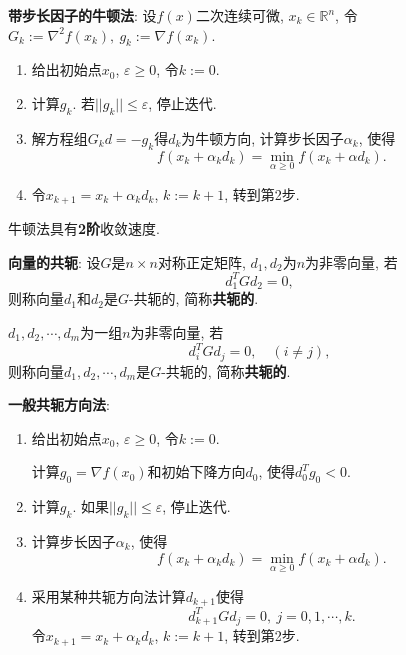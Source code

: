 \documentclass[12pt, a4paper, oneside]{ctexart}
\let\leq=\leqslant %
\let\geq=\geqslant %
\def\R{\mathbb{R}}          %
\begin{document}
\textbf{带步长因子的牛顿法}: 设$f(x)$二次连续可微, $x_k \in \R^n$, 令$G_k:= \nabla^2 f(x_k),\ g_k:= \nabla f(x_k)$.
\begin{enumerate}
    \item 给出初始点$x_0$, $\varepsilon \geq 0$, 令$k:=0$.
    \item 计算$g_k$. 若$||g_k|| \leq \varepsilon$, 停止迭代.
    \item 解方程组$G_kd = -g_k$得$d_k$为牛顿方向, 计算步长因子$\alpha_k$, 使得
    \begin{equation*}
        f(x_k+\alpha_kd_k) = \min_{\alpha \geq 0} f(x_k+\alpha d_k).
    \end{equation*}
    \item 令$x_{k+1} = x_k + \alpha_k d_k$, $k:= k+1$, 转到第2步.
\end{enumerate}


牛顿法具有\textbf{2阶}收敛速度.

\textbf{向量的共轭}: 设$G$是$n\times n$对称正定矩阵, $d_1, d_2$为$n$为非零向量, 若
\begin{equation*}
    d_1^T Gd_2 = 0,
\end{equation*}
则称向量$d_1$和$d_2$是$G$-共轭的, 简称\textbf{共轭的}.

$d_1, d_2,\cdots, d_m$为一组$n$为非零向量, 若
\begin{equation*}
    d_i^T Gd_j = 0,\quad(i\neq j),
\end{equation*}
则称向量$d_1, d_2, \cdots, d_m$是$G$-共轭的, 简称\textbf{共轭的}.

\textbf{一般共轭方向法}: 
\begin{enumerate}
    \item 给出初始点$x_0$, $\varepsilon\geq 0$, 令$k:=0$.
    
    计算$g_0 = \nabla f(x_0)$和初始下降方向$d_0$, 使得$d_0^Tg_0 < 0$.
    \item 计算$g_k$. 如果$||g_k||\leq \varepsilon$, 停止迭代.
    \item 计算步长因子$\alpha_k$, 使得
    \begin{equation*}
        f(x_k+\alpha_kd_k) = \min_{\alpha \geq 0} f(x_k+\alpha d_k).
    \end{equation*}
    \item 采用某种共轭方向法计算$d_{k+1}$使得
    \begin{equation*}
        d_{k+1}^TGd_j = 0,\ j=0,1,\cdots, k.
    \end{equation*}
    令$x_{k+1} = x_k + \alpha_k d_k$, $k:=k+1$, 转到第2步. 
\end{enumerate}
\end{document}
